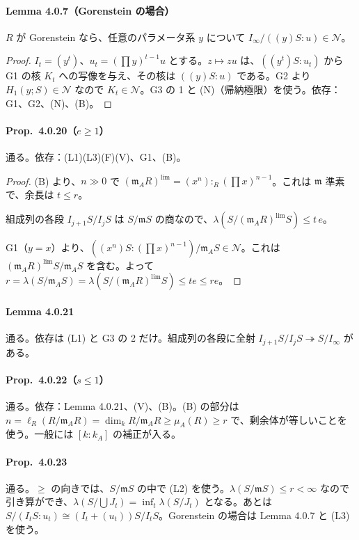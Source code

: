 \documentclass[11pt,a4paper]{ltjsarticle}
\theoremstyle{plain}
\theoremstyle{definition}
\theoremstyle{remark}
\theoremstyle{plain}
\newcommand{\m}{\mathfrak{m}}
\begin{document}
\paragraph{Lemma 4.0.7（Gorenstein の場合）}
$R$ が Gorenstein なら、任意のパラメータ系 $y$ について $I_\infty/((y)S:u)\in\mathcal{N}$。
\begin{proof}
$I_t = (y^t)$、$u_t = (\prod y)^{t-1}u$ とする。$z\mapsto zu$ は、$((y^t)S:u_t)$ から G1 の核 $K_t$ への写像を与え、その核は $((y)S:u)$ である。G2 より $H_1(y;S)\in\mathcal{N}$ なので $K_t\in\mathcal{N}$。G3 の 1 と (N)（帰納極限）を使う。\quad 依存：G1、G2、(N)、(B)。
\end{proof}

\paragraph{Prop.~4.0.20（$e\ge1$）} 通る。依存：(L1)(L3)(F)(V)、G1、(B)。
\begin{proof}
(B) より、$n\gg0$ で $(\m_AR)^{\lim} = (x^n):_R(\prod x)^{n-1}$。これは $\m$ 準素で、余長は $t\le r$。

組成列の各段 $I_{j+1}S/I_jS$ は $S/\m S$ の商なので、$\lambda(S/(\m_AR)^{\lim}S)\le t\,e$。

G1（$y = x$）より、$((x^n)S:(\prod x)^{n-1})/\m_AS\in\mathcal{N}$。これは $(\m_AR)^{\lim}S/\m_AS$ を含む。よって $r = \lambda(S/\m_AS) = \lambda(S/(\m_AR)^{\lim}S)\le te\le re$。
\end{proof}

\paragraph{Lemma 4.0.21} 通る。依存は (L1) と G3 の 2 だけ。組成列の各段に全射 $I_{j+1}S/I_jS\twoheadrightarrow S/I_\infty$ がある。

\paragraph{Prop.~4.0.22（$s\le1$）} 通る。依存：Lemma 4.0.21、(V)、(B)。(B) の部分は $n = \ell_R(R/\m_AR) = \dim_k R/\m_AR\ge\mu_A(R)\ge r$ で、剰余体が等しいことを使う。一般には $[k:k_A]$ の補正が入る。

\paragraph{Prop.~4.0.23} 通る。$\ge$ の向きでは、$S/\m S$ の中で (L2) を使う。$\lambda(S/\m S)\le r<\infty$ なので引き算ができ、$\lambda(S/\bigcup J_t) = \inf_t\lambda(S/J_t)$ となる。あとは $S/(I_tS:u_t)\cong(I_t+(u_t))S/I_tS$。Gorenstein の場合は Lemma 4.0.7 と (L3) を使う。
\end{document}
